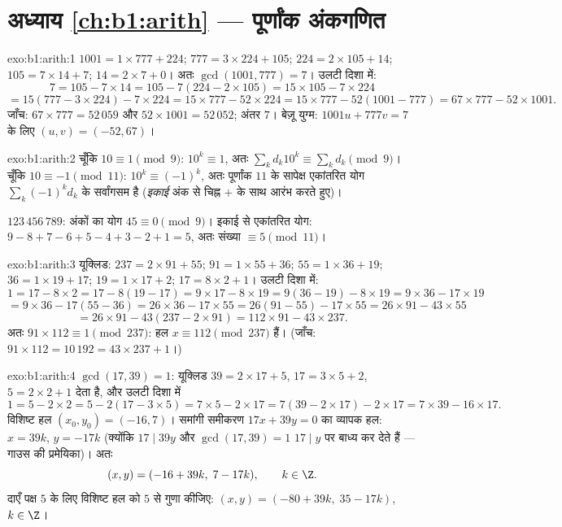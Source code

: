 \section*{अध्याय \ref{ch:b1:arith} --- पूर्णांक अंकगणित}

\begin{solution}{exo:b1:arith:1}
$1001 = 1 \times 777 + 224$; $777 = 3 \times 224 + 105$; $224 = 2 \times 105
+ 14$; $105 = 7 \times 14 + 7$; $14 = 2 \times 7 + 0$। अतः $\gcd(1001, 777)
= 7$। उलटी दिशा में:
\[
7 = 105 - 7 \times 14
= 105 - 7(224 - 2\times 105) = 15 \times 105 - 7 \times 224
\]
\[
= 15(777 - 3\times 224) - 7\times 224 = 15 \times 777 - 52 \times 224
= 15 \times 777 - 52(1001 - 777) = 67 \times 777 - 52 \times 1001 .
\]
जाँच: $67 \times 777 = 52\,059$ और $52 \times 1001 = 52\,052$; अंतर $7$।
बेज़ू युग्म: $1001u + 777v = 7$ के लिए $(u, v) = (-52, 67)$।
\end{solution}

\begin{solution}{exo:b1:arith:2}
चूँकि $10 \equiv 1 \pmod 9$: $10^k \equiv 1$, अतः $\sum_k d_k 10^k \equiv
\sum_k d_k \pmod 9$। चूँकि $10 \equiv -1 \pmod{11}$: $10^k \equiv (-1)^k$,
अतः पूर्णांक $11$ के सापेक्ष एकांतरित योग $\sum_k (-1)^k d_k$ के सर्वांगसम
है (\emph{इकाई} अंक से चिह्न $+$ के साथ आरंभ करते हुए)।

$123\,456\,789$: अंकों का योग $45 \equiv 0 \pmod 9$। इकाई से एकांतरित योग:
$9 - 8 + 7 - 6 + 5 - 4 + 3 - 2 + 1 = 5$, अतः संख्या $\equiv 5 \pmod{11}$।
\end{solution}

\begin{solution}{exo:b1:arith:3}
यूक्लिड: $237 = 2 \times 91 + 55$; $91 = 1 \times 55 + 36$; $55 = 1 \times
36 + 19$; $36 = 1 \times 19 + 17$; $19 = 1 \times 17 + 2$; $17 = 8 \times 2
+ 1$। उलटी दिशा में:
\[
1 = 17 - 8\times 2 = 17 - 8(19 - 17) = 9\times 17 - 8\times 19
= 9(36 - 19) - 8\times 19 = 9\times 36 - 17\times 19
\]
\[
= 9\times 36 - 17(55 - 36) = 26\times 36 - 17\times 55
= 26(91 - 55) - 17\times 55 = 26\times 91 - 43\times 55
\]
\[
= 26\times 91 - 43(237 - 2\times 91) = 112 \times 91 - 43 \times 237.
\]
अतः $91 \times 112 \equiv 1 \pmod{237}$: हल $x \equiv 112 \pmod{237}$ हैं।
(जाँच: $91 \times 112 = 10\,192 = 43 \times 237 + 1$।)
\end{solution}

\begin{solution}{exo:b1:arith:4}
$\gcd(17, 39) = 1$: यूक्लिड $39 = 2\times 17 + 5$, $17 = 3\times 5 + 2$, $5
= 2\times 2 + 1$ देता है, और उलटी दिशा में
\[
1 = 5 - 2\times 2 = 5 - 2(17 - 3\times 5) = 7\times 5 - 2\times 17
= 7(39 - 2\times 17) - 2\times 17 = 7\times 39 - 16\times 17 .
\]
विशिष्ट हल $(x_0, y_0) = (-16, 7)$। समांगी समीकरण $17x + 39y = 0$ का व्यापक
हल: $x = 39k$, $y = -17k$ (क्योंकि $17 \mid 39y$ और $\gcd(17,39) = 1$ $17
\mid y$ पर बाध्य कर देते हैं --- गाउस की प्रमेयिका)। अतः
\[
(x, y) = (-16 + 39k,\; 7 - 17k), \qquad k \in \Z .
\]
दाएँ पक्ष $5$ के लिए विशिष्ट हल को $5$ से गुणा कीजिए: $(x, y) = (-80 +
39k,\; 35 - 17k)$, $k \in \Z$।
\end{solution}

